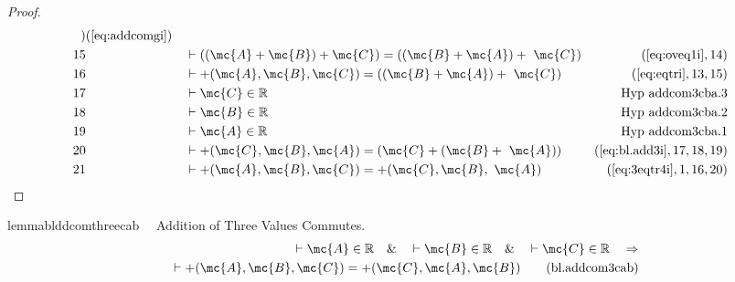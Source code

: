 \begin{proof}
\begin{align}
     ~)&(\mbox{\ref{eq:addcomgi}})\notag
  \\ 15 &&  & \vdash ( ( \mc{A} + \mc{B} ) + \mc{C} ) = ( ( \mc{B} + \mc{A} ) +
     ~\mc{C} )&(\mbox{\ref{eq:oveq1i}},14)\notag
  \\ 16 &&  & \vdash +( \mc{A} , \mc{B} , \mc{C} ) = ( ( \mc{B} + \mc{A} ) +
     ~\mc{C} )&(\mbox{\ref{eq:eqtri}},13,15)\notag
  \\ 17 &&  & \vdash \mc{C} \in
\mathbb{R}&\text{Hyp~addcom3cba.3}\notag%
  \\ 18 &&  & \vdash \mc{B} \in
\mathbb{R}&\text{Hyp~addcom3cba.2}\notag%
  \\ 19 &&  & \vdash \mc{A} \in
\mathbb{R}&\text{Hyp~addcom3cba.1}\notag%
  \\ 20 &&  & \vdash +( \mc{C} , \mc{B} , \mc{A} ) = ( \mc{C} + ( \mc{B} +
     ~\mc{A} ) )&(\mbox{\ref{eq:bl.add3i}},17,18,19)\notag
  \\ 21 &&  & \vdash +( \mc{A} , \mc{B} , \mc{C} ) = +( \mc{C} , \mc{B} ,
     ~\mc{A} )&(\mbox{\ref{eq:3eqtr4i}},1,16,20)\notag
\end{align}
\end{proof}

\begin{restatable}{lemma}{blddcomthreecab}~~ Addition of Three Values Commutes.
\begin{align}
\vdash \mc{A} \in \mathbb{R}\quad\&\quad \vdash \mc{B} \in
    \mathbb{R}\quad\&\quad \vdash \mc{C} \in \mathbb{R}\quad\Rightarrow \notag \\ 
	\quad
    \vdash +( \mc{A} , \mc{B} , \mc{C} ) = +( \mc{C} , \mc{A} , \mc{B}
    )\label{eq:bl.addcom3cab}\tag{bl.addcom3cab}
\end{align}
\end{restatable}

